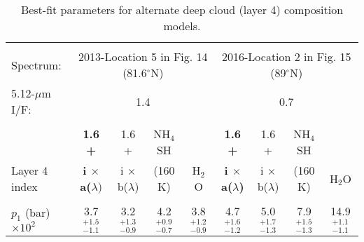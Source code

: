 \documentclass[article,11pt]{emulateapj}
\def\hto{H$_2$O }
\def\degx{$^\circ$}
\def\mum{$\mu$m }
\def\hto{H$_2$O }
\def\nhfsh{NH$_4$SH }
\begin{document}
\begin{table*}[!htb]\centering
\caption{Best-fit parameters for alternate deep cloud (layer 4) composition models.}\label{Tbl:deepfits}
\begin{footnotesize}
\setlength\tabcolsep{2pt}

\begin{tabular}{|l|c c c c|c c c c|}
\hline\\[-0.08in]
Spectrum:  & \multicolumn{4}{|c|}{2013-Location 5 in Fig. 14 (81.6\degx N)} &\multicolumn{4}{|c|}{2016-Location 2 in Fig. 15 (89\degx N)} \\[0.05in]
5.12-\mum I/F:  & \multicolumn{4}{|c|}{1.4} &\multicolumn{4}{|c|}{0.7} \\[0.05in]
\hline\\[-0.05in]
                          &   {\bf   1.6 + }                &      1.6 +          &         \nhfsh       &             &   {\bf    1.6 +   }   &      1.6 +   &      \nhfsh   &   \\[0.05in]
Layer 4 index             &   {\bf  i $\times$ a($\lambda)$}  &  i  $\times$ b($\lambda$)  &      (160 K)  &      \hto  &  {\bf i $\times$ a($\lambda$)}  &   i   $\times$ b($\lambda$)   &   (160 K)    &       \hto\\[0.05in]
\hline\\[-0.05in]
 $p_1$ (bar)$\times 10^2$ &   3.7$^{+  1.5}_{-  1.1}$ &   3.2$^{+ 1.3}_{- 0.9}$ &   4.2$^{+ 0.9}_{- 0.7}$ &   3.8$^{+ 1.2}_{- 0.9}$ &   4.7$^{+ 1.6}_{- 1.2}$ &   5.0$^{+ 1.7}_{- 1.3}$ &   7.9$^{+ 1.5}_{- 1.3}$ &  14.9$^{+ 1.1}_{- 1.1}$\\[0.05in]

\end{tabular}
\end{footnotesize}
\end{table*}
\end{document}

